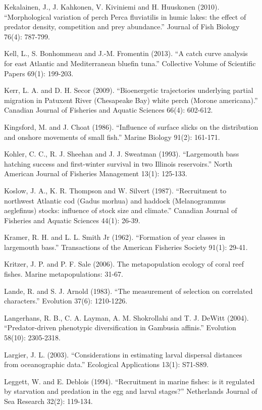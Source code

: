 \documentclass[]{book}
\begin{document}
Kekalainen, J., J. Kahkonen, V. Kiviniemi and H. Huuskonen (2010).
``Morphological variation of perch Perca fluviatilis in humic lakes: the
effect of predator density, competition and prey abundance.'' Journal of
Fish Biology 76(4): 787-799.

Kell, L., S. Bonhommeau and J.-M. Fromentin (2013). ``A catch curve
analysis for east Atlantic and Mediterranean bluefin tuna.'' Collective
Volume of Scientific Papers 69(1): 199-203.

Kerr, L. A. and D. H. Secor (2009). ``Bioenergetic trajectories
underlying partial migration in Patuxent River (Chesapeake Bay) white
perch (Morone americana).'' Canadian Journal of Fisheries and Aquatic
Sciences 66(4): 602-612.

Kingsford, M. and J. Choat (1986). ``Influence of surface slicks on the
distribution and onshore movements of small fish.'' Marine Biology
91(2): 161-171.

Kohler, C. C., R. J. Sheehan and J. J. Sweatman (1993). ``Largemouth
bass hatching success and first-winter survival in two Illinois
reservoirs.'' North American Journal of Fisheries Management 13(1):
125-133.

Koslow, J. A., K. R. Thompson and W. Silvert (1987). ``Recruitment to
northwest Atlantic cod (Gadus morhua) and haddock (Melanogrammus
aeglefinus) stocks: influence of stock size and climate.'' Canadian
Journal of Fisheries and Aquatic Sciences 44(1): 26-39.

Kramer, R. H. and L. L. Smith Jr (1962). ``Formation of year classes in
largemouth bass.'' Transactions of the American Fisheries Society 91(1):
29-41.

Kritzer, J. P. and P. F. Sale (2006). The metapopulation ecology of
coral reef fishes. Marine metapopulations: 31-67.

Lande, R. and S. J. Arnold (1983). ``The measurement of selection on
correlated characters.'' Evolution 37(6): 1210-1226.

Langerhans, R. B., C. A. Layman, A. M. Shokrollahi and T. J. DeWitt
(2004). ``Predator-driven phenotypic diversification in Gambusia
affinis.'' Evolution 58(10): 2305-2318.

Largier, J. L. (2003). ``Considerations in estimating larval dispersal
distances from oceanographic data.'' Ecological Applications 13(1):
S71-S89.

Leggett, W. and E. Deblois (1994). ``Recruitment in marine fishes: is it
regulated by starvation and predation in the egg and larval stages?''
Netherlands Journal of Sea Research 32(2): 119-134.
\end{document}
